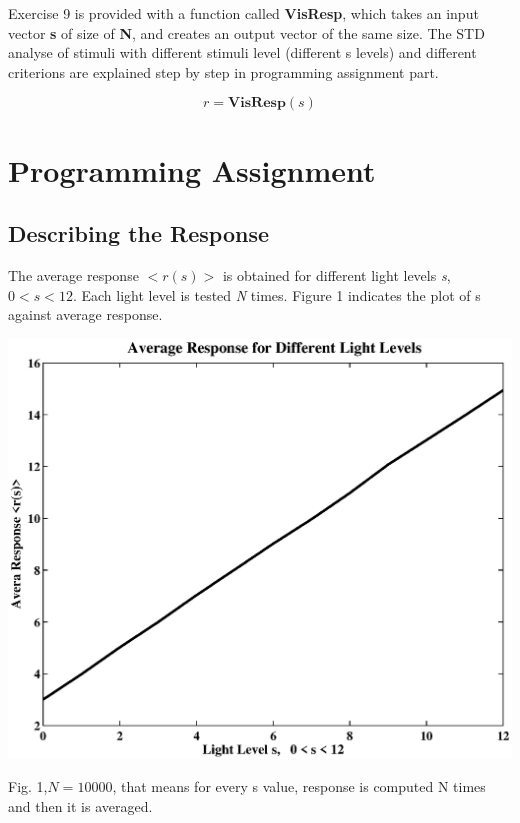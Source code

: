 \documentclass{article}
\begin{document}
Exercise 9 is provided with a function called \textbf{VisResp}, which takes an input vector \textbf{s} of size of \textbf{N}, and creates an output vector of the same size. The STD analyse of stimuli with different stimuli level (different s levels) and different criterions are explained step by step in programming assignment part.

\begin{equation*}
 r=\textbf{VisResp}(s)
\end{equation*}


\section{Programming Assignment}

\subsection{Describing the Response}

The average response $<r(s)>$ is obtained for different light levels \textit{s}, $0<s<12$. Each light level is tested \textit{N} times. Figure 1 indicates the plot of s against average response. 

\begin{center}
 \includegraphics[width=\textwidth]{ave_resp.eps}
\begin{footnotesize} Fig. 1,$N=10000$, that means for every s value, response is computed N times and then it is averaged. 
\end{footnotesize}
\end{center} 
\end{document}
